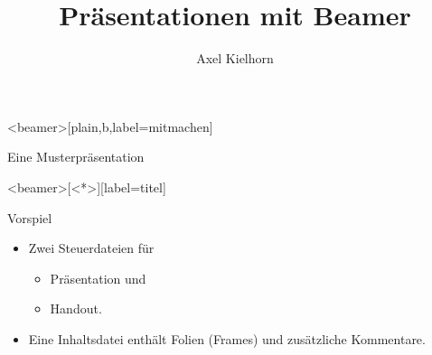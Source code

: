 
%
%
\usepackage[TS1,T1]{fontenc}
\usepackage{libertine}


%
%

\title{Präsentationen mit Beamer}
\author{Axel Kielhorn}



\begin{frame}<beamer>[plain,b,label=mitmachen] %

\huge\bfseries\color{structure!20} %

Eine Musterpräsentation

\vspace*{7.1cm}

\end{frame}



\begin{frame}<beamer>[<*>][label=titel]{}
  \titlepage
\end{frame}

\maketitle

\begin{frame}[label=vorspiel]{Vorspiel}
  \begin{itemize}[<*>]
    \item Zwei Steuerdateien für 
      \begin{itemize}
        \item Präsentation und
        \item Handout.
      \end{itemize}     
    \item Eine Inhaltsdatei enthält Folien (Frames) und zusätzliche Kommentare.
  \end{itemize}
\end{frame}

